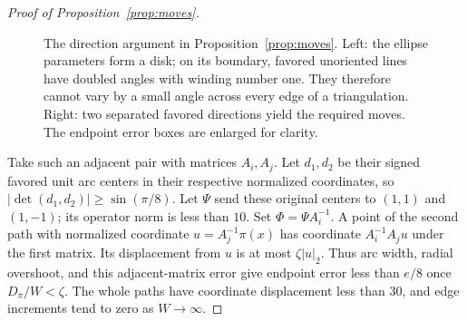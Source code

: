 \documentclass[11pt]{article}
\theoremstyle{definition}
\begin{document}
\begin{proof}[Proof of Proposition~\ref{prop:moves}]
\begin{figure}[htbp]
\centering
{}
\caption{The direction argument in Proposition~\ref{prop:moves}.
Left: the ellipse parameters form a disk; on its boundary, favored
unoriented lines have doubled angles with winding number one.
They therefore cannot vary by a small angle across every edge of
a triangulation. Right: two separated favored directions yield
the required moves. The endpoint error boxes are enlarged for clarity.}
\label{fig:moves}
\end{figure}


Take such an adjacent pair with matrices $A_i,A_j$. Let $d_1,d_2$
be their signed favored unit arc centers in their respective normalized
coordinates, so $|\det(d_1,d_2)|\ge\sin(\pi/8)$. Let $\Psi$ send
these original centers to $(1,1)$ and $(1,-1)$; its operator norm is
less than $10$. Set $\Phi=\Psi A_i^{-1}$. A point of the second path
with normalized coordinate $u=A_j^{-1}\pi(x)$ has coordinate
$A_i^{-1}A_j u$ under the first matrix. Its displacement from $u$
is at most $\zeta|u|_2$. Thus arc width, radial overshoot, and this
adjacent-matrix error give endpoint error less than $e/8$ once
$D_\pi/W<\zeta$. The whole paths have coordinate displacement less
than $30$, and edge increments tend to zero as $W\to\infty$.


\end{proof}
\end{document}
